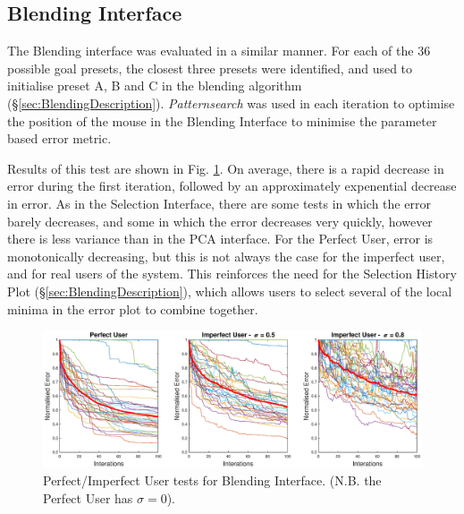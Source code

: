 \documentclass[11pt, oneside]{report}   	%
\begin{document}
\subsection{Blending Interface} \label{sec:BlendingEval}
The Blending interface was evaluated in a similar manner. For each of the 36 possible goal presets, the closest three presets were identified, and used to initialise preset A, B and C in the blending algorithm (\S \ref{sec:BlendingDescription}). \emph{Patternsearch} was used in each iteration to optimise the position of the mouse in the Blending Interface to minimise the parameter based error metric. 

Results of this test are shown in Fig. \ref{fig:BlendingTest1}.
On average, there is a rapid decrease in error during the first iteration, followed by an approximately expenential decrease in error.
As in the Selection Interface, there are some tests in which the error barely decreases, and some in which the error decreases very quickly, however there is less variance than in the PCA interface. For the Perfect User, error is monotonically decreasing, but this is not always the case for the imperfect user, and for real users of the system. This reinforces the need for the Selection History Plot (\S \ref{sec:BlendingDescription}), which allows users to select several of the local minima in the error plot to combine together. 
\begin{figure}[h]
	\hspace{-70pt}
	\includegraphics[width = 8in]{BlendingInterfaceTests1.eps}
	\caption{Perfect/Imperfect User tests for Blending Interface. (N.B. the Perfect User has $\sigma = 0$).}
	\label{fig:BlendingTest1}
		\vspace{-10pt}
\end{figure}
\end{document}
